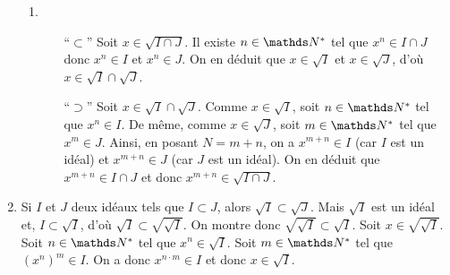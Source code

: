 \documentclass[a4paper]{article}
\begin{document}
\begin{enumerate}
\begin{enumerate}
				\item
					\begin{itemize}
						\item[``$\subset$''] Soit $x \in \sqrt{I \cap J}$. Il existe $n \in \N^*$\/ tel que $x^n \in I \cap J$\/ donc $x^n \in I$\/ et $x^n \in J$. On en déduit que $x \in \sqrt{I}$\/ et $x \in \sqrt{J}$, d'où $x \in \sqrt{I} \cap \sqrt{J}$.
						\item[``$\supset$''] Soit $x \in \sqrt{I} \cap \sqrt{J}$.
							Comme $x \in \sqrt{I}$, soit $n \in \N^*$\/ tel que $x^n \in I$. De même, comme $x \in \sqrt{J}$, soit $m \in \N^*$\/ tel que $x^m \in J$. Ainsi, en posant $N = m + n$, on a $x^{m+n} \in I$\/ (car $I$\/ est un idéal) et $x^{m+n} \in J$\/ (car $J$\/ est un idéal). On en déduit que $x^{m+n} \in I \cap J$\/ et donc $x^{m+n} \in \sqrt{I \cap J}$.
					\end{itemize}
			\end{enumerate}
		\item Si $I$\/ et $J$\/ deux idéaux tels que $I\subset J$, alors $\sqrt{I} \subset \sqrt{J}$. Mais $\sqrt{I}$\/ est un idéal et, $I \subset \sqrt{I}$, d'où $\sqrt{I} \subset \sqrt{\sqrt{I}}$. On montre donc $\sqrt{\sqrt{I}} \subset \sqrt{I}$. Soit $x \in \sqrt{\sqrt{I}}$. Soit $n \in \N^*$\/ tel que $x^n \in \sqrt{I}$. Soit $m \in \N^*$\/ tel que $(x^n)^m \in I$. On a donc $x^{n\cdot m} \in I$\/ et donc $x \in \sqrt{I}$.
	\end{enumerate}
\end{document}
